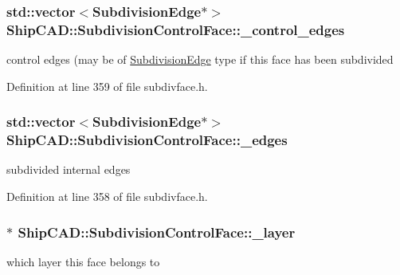 \subsubsection[{\texorpdfstring{\+\_\+control\+\_\+edges}{_control_edges}}]{\setlength{\rightskip}{0pt plus 5cm}std\+::vector$<${\bf Subdivision\+Edge}$\ast$$>$ Ship\+C\+A\+D\+::\+Subdivision\+Control\+Face\+::\+\_\+control\+\_\+edges\hspace{0.3cm}{\ttfamily [protected]}}\hypertarget{classShipCAD_1_1SubdivisionControlFace_a33d7e2ecd5f42edf5492efb83df3856b}{}\label{classShipCAD_1_1SubdivisionControlFace_a33d7e2ecd5f42edf5492efb83df3856b}
control edges (may be of \hyperlink{classShipCAD_1_1SubdivisionEdge}{Subdivision\+Edge} type if this face has been subdivided 

Definition at line 359 of file subdivface.\+h.

\subsubsection[{\texorpdfstring{\+\_\+edges}{_edges}}]{\setlength{\rightskip}{0pt plus 5cm}std\+::vector$<${\bf Subdivision\+Edge}$\ast$$>$ Ship\+C\+A\+D\+::\+Subdivision\+Control\+Face\+::\+\_\+edges\hspace{0.3cm}{\ttfamily [protected]}}\hypertarget{classShipCAD_1_1SubdivisionControlFace_a390f626d9999ab3ce48878b223ea1693}{}\label{classShipCAD_1_1SubdivisionControlFace_a390f626d9999ab3ce48878b223ea1693}
subdivided internal edges 

Definition at line 358 of file subdivface.\+h.

\subsubsection[{\texorpdfstring{\+\_\+layer}{_layer}}]{$\ast$ Ship\+C\+A\+D\+::\+Subdivision\+Control\+Face\+::\+\_\+layer\hspace{0.3cm}{\ttfamily [protected]}}\hypertarget{classShipCAD_1_1SubdivisionControlFace_aee1990d4db7127ba59117a65c1a6ce7e}{}\label{classShipCAD_1_1SubdivisionControlFace_aee1990d4db7127ba59117a65c1a6ce7e}
which layer this face belongs to 

